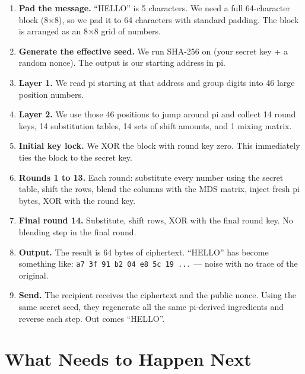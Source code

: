 \documentclass[12pt, a4paper]{article}
\begin{document}
\begin{enumerate}[leftmargin=*, label=\textbf{Step \arabic*.}]

  \item \textbf{Pad the message.} ``HELLO'' is 5 characters. We need a full 64-character block (8$\times$8), so we pad it to 64 characters with standard padding. The block is arranged as an 8$\times$8 grid of numbers.

  \item \textbf{Generate the effective seed.} We run SHA-256 on (your secret key + a random nonce). The output is our starting address in pi.

  \item \textbf{Layer 1.} We read pi starting at that address and group digits into 46 large position numbers.

  \item \textbf{Layer 2.} We use those 46 positions to jump around pi and collect 14 round keys, 14 substitution tables, 14 sets of shift amounts, and 1 mixing matrix.

  \item \textbf{Initial key lock.} We XOR the block with round key zero. This immediately ties the block to the secret key.

  \item \textbf{Rounds 1 to 13.} Each round: substitute every number using the secret table, shift the rows, blend the columns with the MDS matrix, inject fresh pi bytes, XOR with the round key.

  \item \textbf{Final round 14.} Substitute, shift rows, XOR with the final round key. No blending step in the final round.

  \item \textbf{Output.} The result is 64 bytes of ciphertext. ``HELLO'' has become something like: \texttt{a7 3f 91 b2 04 e8 5c 19 ...} --- noise with no trace of the original.

  \item \textbf{Send.} The recipient receives the ciphertext and the public nonce. Using the same secret seed, they regenerate all the same pi-derived ingredients and reverse each step. Out comes ``HELLO''.

\end{enumerate}

\section{What Needs to Happen Next}
\end{document}
